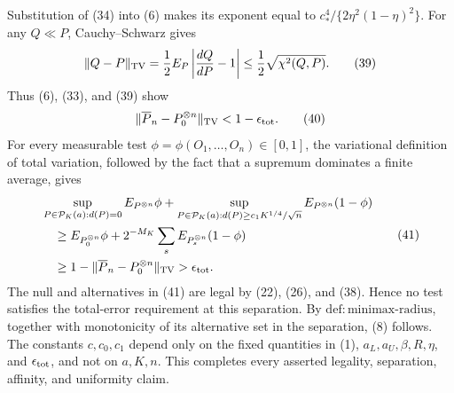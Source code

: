 Substitution of (34) into (6) makes its exponent equal to \(c_*^4/\{2\eta^2(1-\eta)^2\}\).  For any \(Q\ll P\), Cauchy--Schwarz gives
\[
\|Q-P\|_{\rm TV}
=\frac12E_P\left|\frac{dQ}{dP}-1\right|
\le\frac12\sqrt{\chi^2(Q,P)}.
\tag{39}
\]
Thus (6), (33), and (39) show
\[
\|\overline P_n-P_0^{\otimes n}\|_{\rm TV}<1-\epsilon_{\rm tot}.
\tag{40}
\]
For every measurable test \(\phi=\phi(O_1,\ldots,O_n)\in[0,1]\), the variational definition of total variation, followed by the fact that a supremum dominates a finite average, gives
\[
\begin{aligned}
&\sup_{P\in\mathcal P_K(a):d(P)=0}E_{P^{\otimes n}}\phi
+\sup_{P\in\mathcal P_K(a):d(P)\ge c_1K^{1/4}/\sqrt n}
 E_{P^{\otimes n}}(1-\phi) \\
&\quad\ge
E_{P_0^{\otimes n}}\phi
+2^{-M_K}\sum_sE_{P_s^{\otimes n}}(1-\phi) \\
&\quad\ge1-\|\overline P_n-P_0^{\otimes n}\|_{\rm TV}
>\epsilon_{\rm tot}.
\end{aligned}
\tag{41}
\]
The null and alternatives in (41) are legal by (22), (26), and (38).  Hence no test satisfies the total-error requirement at this separation.  By \(\mathrm{def:minimax\mbox{-}radius}\), together with monotonicity of its alternative set in the separation, (8) follows.  The constants \(c,c_0,c_1\) depend only on the fixed quantities in (1), \(a_L,a_U,\beta,R,\eta\), and \(\epsilon_{\rm tot}\), and not on \(a,K,n\).  This completes every asserted legality, separation, affinity, and uniformity claim.
